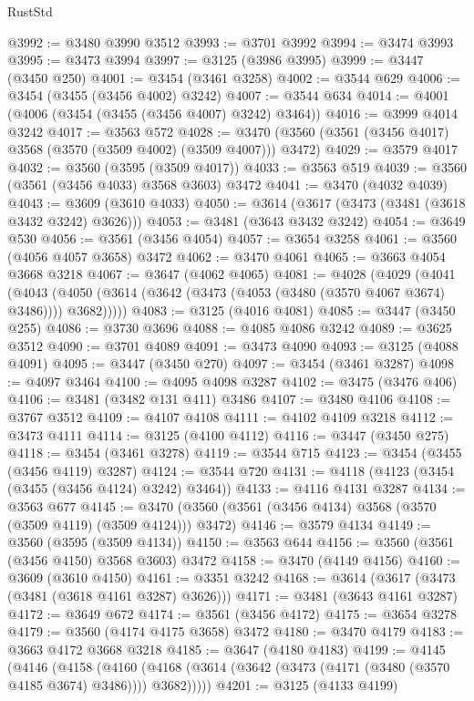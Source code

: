 \begin{lexlean}{RustStd}
\begin{coremodule}
@3992 := @3480 @3990 @3512
@3993 := @3701 @3992
@3994 := @3474 @3993
@3995 := @3473 @3994
@3997 := @3125 (@3986 @3995)
@3999 := @3447 (@3450 @250)
@4001 := @3454 (@3461 @3258)
@4002 := @3544 @629
@4006 := @3454 (@3455 (@3456 @4002) @3242)
@4007 := @3544 @634
@4014 := @4001 (@4006 (@3454 (@3455 (@3456 @4007) @3242) @3464))
@4016 := @3999 @4014 @3242
@4017 := @3563 @572
@4028 := @3470 (@3560 (@3561 (@3456 @4017) @3568 (@3570 (@3509 @4002) (@3509 @4007))) @3472)
@4029 := @3579 @4017
@4032 := @3560 (@3595 (@3509 @4017))
@4033 := @3563 @519
@4039 := @3560 (@3561 (@3456 @4033) @3568 @3603) @3472
@4041 := @3470 (@4032 @4039)
@4043 := @3609 (@3610 @4033)
@4050 := @3614 (@3617 (@3473 (@3481 (@3618 @3432 @3242) @3626)))
@4053 := @3481 (@3643 @3432 @3242)
@4054 := @3649 @530
@4056 := @3561 (@3456 @4054)
@4057 := @3654 @3258
@4061 := @3560 (@4056 @4057 @3658) @3472
@4062 := @3470 @4061
@4065 := @3663 @4054 @3668 @3218
@4067 := @3647 (@4062 @4065)
@4081 := @4028
    (@4029
      (@4041
        (@4043 (@4050 (@3614 (@3642 (@3473 (@4053 (@3480 (@3570 @4067 @3674) @3486)))) @3682)))))
@4083 := @3125 (@4016 @4081)
@4085 := @3447 (@3450 @255)
@4086 := @3730 @3696
@4088 := @4085 @4086 @3242
@4089 := @3625 @3512
@4090 := @3701 @4089
@4091 := @3473 @4090
@4093 := @3125 (@4088 @4091)
@4095 := @3447 (@3450 @270)
@4097 := @3454 (@3461 @3287)
@4098 := @4097 @3464
@4100 := @4095 @4098 @3287
@4102 := @3475 (@3476 @406)
@4106 := @3481 (@3482 @131 @411) @3486
@4107 := @3480 @4106
@4108 := @3767 @3512
@4109 := @4107 @4108
@4111 := @4102 @4109 @3218
@4112 := @3473 @4111
@4114 := @3125 (@4100 @4112)
@4116 := @3447 (@3450 @275)
@4118 := @3454 (@3461 @3278)
@4119 := @3544 @715
@4123 := @3454 (@3455 (@3456 @4119) @3287)
@4124 := @3544 @720
@4131 := @4118 (@4123 (@3454 (@3455 (@3456 @4124) @3242) @3464))
@4133 := @4116 @4131 @3287
@4134 := @3563 @677
@4145 := @3470 (@3560 (@3561 (@3456 @4134) @3568 (@3570 (@3509 @4119) (@3509 @4124))) @3472)
@4146 := @3579 @4134
@4149 := @3560 (@3595 (@3509 @4134))
@4150 := @3563 @644
@4156 := @3560 (@3561 (@3456 @4150) @3568 @3603) @3472
@4158 := @3470 (@4149 @4156)
@4160 := @3609 (@3610 @4150)
@4161 := @3351 @3242
@4168 := @3614 (@3617 (@3473 (@3481 (@3618 @4161 @3287) @3626)))
@4171 := @3481 (@3643 @4161 @3287)
@4172 := @3649 @672
@4174 := @3561 (@3456 @4172)
@4175 := @3654 @3278
@4179 := @3560 (@4174 @4175 @3658) @3472
@4180 := @3470 @4179
@4183 := @3663 @4172 @3668 @3218
@4185 := @3647 (@4180 @4183)
@4199 := @4145
    (@4146
      (@4158
        (@4160 (@4168 (@3614 (@3642 (@3473 (@4171 (@3480 (@3570 @4185 @3674) @3486)))) @3682)))))
@4201 := @3125 (@4133 @4199)

\end{coremodule}
\end{lexlean}
